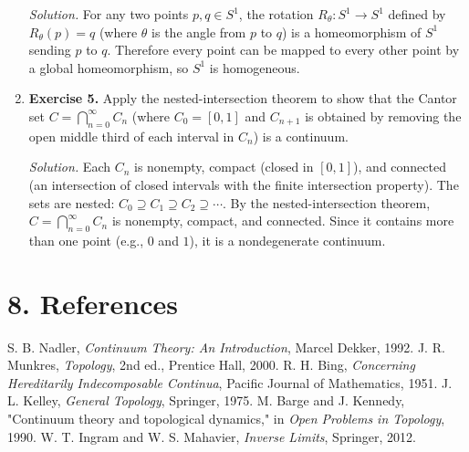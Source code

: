 \begin{enumerate}[leftmargin=*,itemsep=0.9em]
\emph{Solution.} For any two points $p,q\in S^1$, the rotation $R_\theta:S^1\to S^1$ defined by $R_\theta(p)=q$ (where $\theta$ is the angle from $p$ to $q$) is a homeomorphism of $S^1$ sending $p$ to $q$. Therefore every point can be mapped to every other point by a global homeomorphism, so $S^1$ is homogeneous.

\item \textbf{Exercise 5.} Apply the nested-intersection theorem to show that the Cantor set $C=\bigcap_{n=0}^{\infty}C_n$ (where $C_0=[0,1]$ and $C_{n+1}$ is obtained by removing the open middle third of each interval in $C_n$) is a continuum.

\emph{Solution.} Each $C_n$ is nonempty, compact (closed in $[0,1]$), and connected (an intersection of closed intervals with the finite intersection property). The sets are nested: $C_0\supseteq C_1\supseteq C_2\supseteq\cdots$. By the nested-intersection theorem, $C=\bigcap_{n=0}^{\infty}C_n$ is nonempty, compact, and connected. Since it contains more than one point (e.g., $0$ and $1$), it is a nondegenerate continuum.

\end{enumerate}
\section*{8. References}


\begin{thebibliography}{9}
 S. B. Nadler, \emph{Continuum Theory: An Introduction}, Marcel Dekker, 1992.
 J. R. Munkres, \emph{Topology}, 2nd ed., Prentice Hall, 2000.
 R. H. Bing, \emph{Concerning Hereditarily Indecomposable Continua}, Pacific Journal of Mathematics, 1951.
 J. L. Kelley, \emph{General Topology}, Springer, 1975.
 M. Barge and J. Kennedy, "Continuum theory and topological dynamics," in \emph{Open Problems in Topology}, 1990.
 W. T. Ingram and W. S. Mahavier, \emph{Inverse Limits}, Springer, 2012.
\end{thebibliography}
